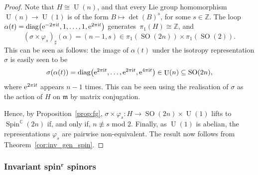 \documentclass[pdftex]{sigma}
\numberwithin{equation}{section}
\newcommand{\Z}{\mathbb{Z}} %
\DeclareMathOperator{\diag}{diag}
\DeclareMathOperator{\SO}{SO}
\DeclareMathOperator{\Spin}{Spin}
\DeclareMathOperator{\U}{U}
\begin{document}
		\begin{proof}
			Note that $H \cong \U(n)$, and that every Lie group homomorphism $\U(n) \to \U(1)$ is of the form $B \mapsto \det(B)^s$, for some $s \in \mathbb{Z}$. The loop $\alpha(t) = \diag \bigl( {\rm e}^{- 2 \pi {\rm i} t} , 1 , \dots , 1 , {\rm e}^{2 \pi {\rm i} t} \bigr)$ generates~${\pi_1 ( H ) \cong \Z}$, and
			\[
			( \sigma \times \varphi_s )_{\sharp} (\alpha) = ( n-1 , s ) \in \pi_1 ( \SO(2n) ) \times \pi_1 ( \SO(2) ) .
			\]
			This can be seen as follows: the image of $\alpha (t)$ under the isotropy representation $\sigma$ is easily seen to be
			\begin{equation*}
				\sigma ( \alpha (t) ) = \diag \bigl( {\rm e}^{2 \pi {\rm i} t} , \dots , {\rm e}^{2 \pi {\rm i} t} , {\rm e}^{4 \pi {\rm i} t} \bigr) \in \U(n) \subseteq \SO(2n) ,
			\end{equation*}
			where ${\rm e}^{2 \pi {\rm i} t}$ appears $n-1$ times. This can be seen using the realisation of $\sigma$ as the action of $H$ on $\mathfrak{m}$ by matrix conjugation.
			
			Hence, by Proposition~\ref{prop:fg}, $\sigma \times \varphi_s \colon H \to \SO(2n) \times \U(1)$ lifts to $\Spin^{\mathbb{C}}(2n)$ if, and only if, $n \not\equiv s$ mod $2$. Finally, as $\U(1)$ is abelian, the representations $\varphi_s$ are pairwise non-equivalent. The result now follows from Theorem~\ref{cor:inv_gen_spin}.
		\end{proof}
		
		\subsubsection[Invariant spin\^{}r spinors]{Invariant spin$^{\boldsymbol{r}}$ spinors}\label{section:her_cpn:spinors}
		
\end{document}
